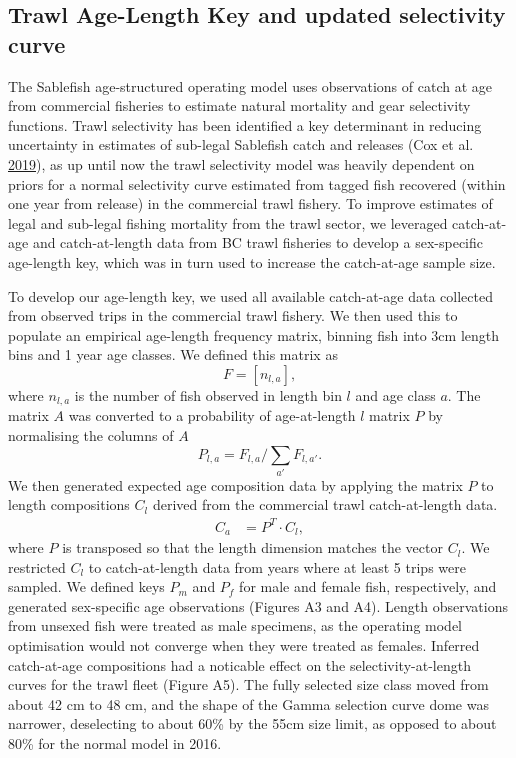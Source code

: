 \documentclass[11pt]{book}
\begin{document}
\hypertarget{trawl-age-length-key-and-updated-selectivity-curve}{%
\subsection{Trawl Age-Length Key and updated selectivity curve}\label{trawl-age-length-key-and-updated-selectivity-curve}}

The Sablefish age-structured operating model uses observations of catch at age from commercial fisheries to estimate natural mortality and gear selectivity functions. Trawl selectivity has been identified a key determinant in reducing uncertainty in estimates of sub-legal Sablefish catch and releases (Cox et al. \protect\hyperlink{ref-cox2019evaluating}{2019}), as up until now the trawl selectivity model was heavily dependent on priors for a normal selectivity curve estimated from tagged fish recovered (within one year from release) in the commercial trawl fishery. To improve estimates of legal and sub-legal fishing mortality from the trawl sector, we leveraged catch-at-age and catch-at-length data from BC trawl fisheries to develop a sex-specific age-length key, which was in turn used to increase the catch-at-age sample size.

To develop our age-length key, we used all available catch-at-age data collected from observed trips in the commercial trawl fishery. We then used this to populate an empirical age-length frequency matrix, binning fish into 3cm length bins and 1 year age classes. We defined this matrix as \begin{equation}
F = \left[ n_{l,a} \right],
\end{equation} where \(n_{l,a}\) is the number of fish observed in length bin \(l\) and age class \(a\). The matrix \(A\) was converted to a probability of age-at-length \(l\) matrix \(P\) by normalising the columns of \(A\) \begin{equation}
P_{l,a} = F_{l,a} / \sum_{a'} F_{l,a'}. 
\end{equation}
We then generated expected age composition data by applying the matrix \(P\) to length compositions \(C_l\) derived from the commercial trawl catch-at-length data. \begin{align}
C_a &= P^T \cdot C_l,
\end{align} where \(P\) is transposed so that the length dimension matches the vector \(C_l\). We restricted \(C_l\) to catch-at-length data from years where at least 5 trips were sampled. We defined keys \(P_m\) and \(P_f\) for male and female fish, respectively, and generated sex-specific age observations (Figures A3 and A4). Length observations from unsexed fish were treated as male specimens, as the operating model optimisation would not converge when they were treated as females.
Inferred catch-at-age compositions had a noticable effect on the selectivity-at-length curves for the trawl fleet (Figure A5). The fully selected size class moved from about 42 cm to 48 cm, and the shape of the Gamma selection curve dome was narrower, deselecting to about 60\% by the 55cm size limit, as opposed to about 80\% for the normal model in 2016.
\end{document}
